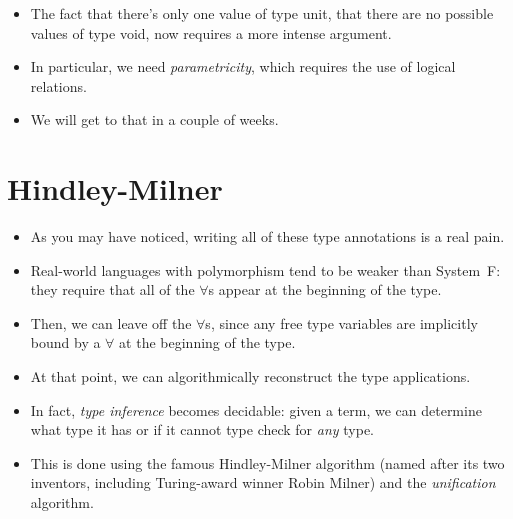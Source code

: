 \documentclass{lecturenotes}
\newcommand{\utype}{\textsf{unit}\xspace}
\newcommand{\vtype}{\textsf{void}\xspace}
\begin{document}
\begin{itemize}
\item The fact that there's only one value of type \utype, that there are no possible values of type \vtype, now requires a more intense argument.
\item In particular, we need \emph{parametricity}, which requires the use of logical relations.
\item We will get to that in a couple of weeks.
\end{itemize}

\section{Hindley-Milner}
\label{sec:hindley-milner}

\begin{itemize}
\item As you may have noticed, writing all of these type annotations is a real pain.
\item Real-world languages with polymorphism tend to be weaker than System~F: they require that all of the $\forall$s appear at the beginning of the type.
\item Then, we can leave off the $\forall$s, since any free type variables are implicitly bound by a $\forall$ at the beginning of the type.
\item At that point, we can algorithmically reconstruct the type applications.
\item In fact, \emph{type inference} becomes decidable: given a term, we can determine what type it has or if it cannot type check for \emph{any} type.
\item This is done using the famous Hindley-Milner algorithm (named after its two inventors, including Turing-award winner Robin Milner) and the \emph{unification} algorithm.
\end{itemize}
\end{document}
